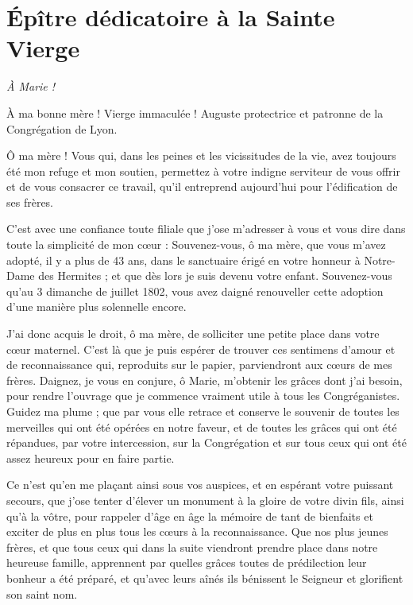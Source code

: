 \chapter*{Épître dédicatoire à la Sainte Vierge}

\begin{center}
\textit{À Marie !}\par
À ma bonne mère ! Vierge immaculée ! Auguste protectrice et patronne de la Congrégation de Lyon.
\end{center}

Ô ma mère ! Vous qui, dans les peines et les vicissitudes de la vie, avez toujours été mon refuge et mon soutien, permettez à votre indigne serviteur de vous offrir et de vous consacrer ce travail, qu'il entreprend aujourd'hui pour l'édification de ses frères.

C'est avec une confiance toute filiale que j'ose m'adresser à vous et vous dire dans toute la simplicité de mon cœur : Souvenez-vous, ô ma mère, que vous m'avez adopté, il y a plus de 43 ans, dans le sanctuaire érigé en votre honneur à Notre-Dame des Hermites ; et que dès lors je suis devenu votre enfant. Souvenez-vous qu'au 3 dimanche de juillet 1802, vous avez daigné renouveller cette adoption d'une manière plus solennelle encore.

J'ai donc acquis le droit, ô ma mère, de solliciter une petite place dans votre cœur maternel. C'est là que je puis espérer de trouver ces sentimens d'amour et de reconnaissance qui, reproduits sur le papier, parviendront aux cœurs de mes frères. Daignez, je vous en conjure, ô Marie, m'obtenir les grâces dont j'ai besoin, pour rendre l'ouvrage que je commence vraiment
utile à tous les Congréganistes. Guidez ma plume ; que par vous elle retrace et conserve le souvenir de toutes les merveilles qui ont été opérées en notre faveur, et de toutes les grâces qui ont été répandues, par votre intercession, sur la Congrégation et sur tous ceux qui ont été assez heureux pour en faire partie.

Ce n'est qu'en me plaçant ainsi sous vos auspices, et en espérant votre puissant secours, que j'ose tenter d'élever un monument à la gloire de votre divin fils, ainsi qu'à la vôtre, pour rappeler d'âge en âge la mémoire de tant de bienfaits et exciter de plus en plus tous les cœurs à la reconnaissance. Que nos plus jeunes frères, et que tous ceux qui dans la suite viendront prendre place dans notre heureuse famille, apprennent par quelles grâces toutes de prédilection leur bonheur a été préparé, et qu'avec leurs aînés ils bénissent le Seigneur et glorifient son saint nom.

